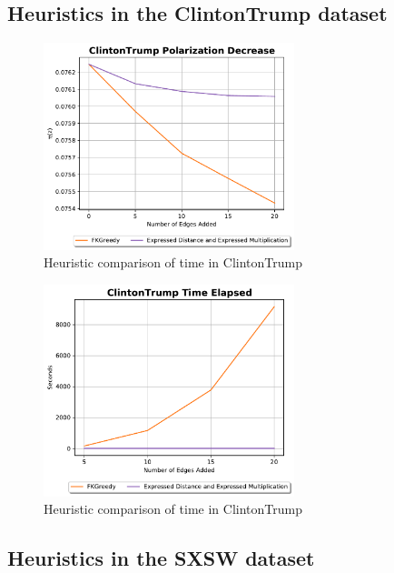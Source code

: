 \subsection{Heuristics in the ClintonTrump dataset}
\begin{figure}[!htbp]
	\centering
	\includegraphics[width=0.65\textwidth]{Figures/ClintonTrump Polarization Decrease}
	\caption{Heuristic comparison of time in ClintonTrump}
	\label{fig:ClintonTrump_pol}
\end{figure}


\begin{figure}[!htbp]
	\centering
	\includegraphics[width=0.65\textwidth]{Figures/ClintonTrump Time Elapsed}
	\caption{Heuristic comparison of time in ClintonTrump}
	\label{fig:ClintonTrump_time}
\end{figure}
\clearpage


\subsection{Heuristics in the SXSW dataset}

